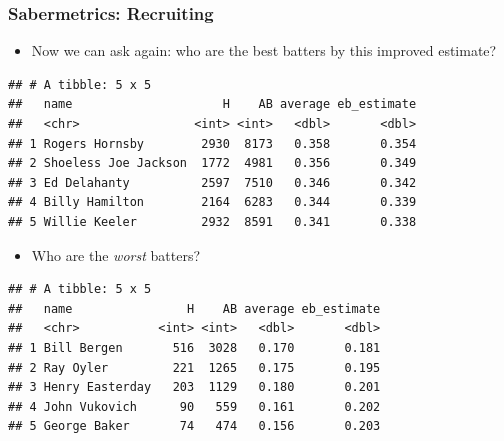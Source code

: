 \documentclass[
  shownotes,
  xcolor={svgnames},
  hyperref={colorlinks,citecolor=DarkBlue,linkcolor=DarkRed,urlcolor=DarkBlue}
  ]{beamer}
\begin{document}
\begin{frame}[fragile]
\frametitle{Sabermetrics: Recruiting}

\begin{itemize}
  \item Now we can ask again: who are the best batters by this improved estimate?
\end{itemize}


\begin{footnotesize}
\begin{verbatim}
## # A tibble: 5 x 5
##   name                     H    AB average eb_estimate
##   <chr>                <int> <int>   <dbl>       <dbl>
## 1 Rogers Hornsby        2930  8173   0.358       0.354
## 2 Shoeless Joe Jackson  1772  4981   0.356       0.349
## 3 Ed Delahanty          2597  7510   0.346       0.342
## 4 Billy Hamilton        2164  6283   0.344       0.339
## 5 Willie Keeler         2932  8591   0.341       0.338
\end{verbatim}
\end{footnotesize}

\begin{itemize}
\item Who are the \emph{worst} batters?
\end{itemize}
\begin{footnotesize}
\begin{verbatim}
## # A tibble: 5 x 5
##   name                H    AB average eb_estimate
##   <chr>           <int> <int>   <dbl>       <dbl>
## 1 Bill Bergen       516  3028   0.170       0.181
## 2 Ray Oyler         221  1265   0.175       0.195
## 3 Henry Easterday   203  1129   0.180       0.201
## 4 John Vukovich      90   559   0.161       0.202
## 5 George Baker       74   474   0.156       0.203
\end{verbatim}
\end{footnotesize}

\end{frame}
\end{document}
